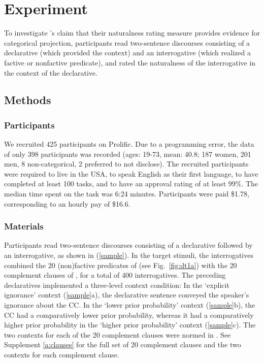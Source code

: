 \documentclass[11pt,fleqn]{article}
\newcommand{\6}{\mbox{$[\hspace*{-.6mm}[$}}
\newcommand{\9}{\mbox{$]\hspace*{-.6mm}]$}}
\newcommand{\citepos}[1]{\citeauthor{#1}'s \citeyear{#1}}
\begin{document}
\section{Experiment}\label{s2}

To investigate \citepos{mandelkern-etal2020} claim that their naturalness rating measure provides evidence for categorical projection, participants read two-sentence discourses consisting of a declarative (which provided the context) and an interrogative (which realized a factive or nonfactive predicate), and rated the naturalness of the interrogative in the context of the declarative.

\subsection{Methods}\label{s-methods}

\subsubsection{Participants}

We recruited 425 participants on Prolific. Due to a programming error, the data of only 398 participants was recorded (ages: 19-73, mean: 40.8; 187 women, 201 men, 8 non-categorical, 2 preferred to not disclose). The recruited participants were required to live in the USA, to speak English as their first language, to have completed at least 100 tasks, and to have an approval rating of at least 99\%. The median time spent on the task was 6:24 minutes. Participants were paid \$1.78, corresponding to an hourly pay of \$16.6.


\subsubsection{Materials}

Participants read two-sentence discourses consisting of a declarative followed by an interrogative, as shown in (\ref{sample}). In the target stimuli, the interrogatives combined the 20 (non)factive predicates of \citealt{degen-tonhauser-language} (see Fig.~\ref{fig:dt1a}) with the 20 complement clauses of \citealt{degen-tonhauser-language}, for a total of 400 interrogatives. The preceding declaratives implemented a three-level context condition: In the `explicit ignorance' context (\ref{sample}a), the declarative sentence conveyed the speaker's ignorance about the CC. In the `lower prior probability' context (\ref{sample}b), the CC had a comparatively lower prior probability, whereas it had a comparatively higher prior probability in the `higher prior probability' context (\ref{sample}c). The two contexts for each of the 20 complement clauses were normed in \citealt{degen-tonhauser-openmind}. See Supplement \ref{a:clauses} for the full set of 20 complement clauses and the two contexts for each complement clause.
\end{document}
